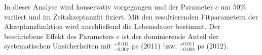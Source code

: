 \documentclass{article}
\begin{document}
In dieser Analyse wird konservativ vorgegangen und der Parameter $c$ um 50\% variiert und im Zeitakzeptanzfit fixiert. Mit den resultierenden Fitparametern der Akzeptanzfunktion wird anschließend die Lebensdauer bestimmt. %
Der beschriebene Effekt des Parameters $c$ ist der dominierende Anteil der systematischen Unsicherheiten mit $^{+0.011}_{-0.007}$ ps (2011) bzw. $^{+0.011}_{-0.008}$ ps (2012).
  
%
\end{document}
